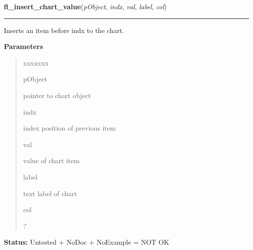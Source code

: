 \hspace{.8\funcindent}\begin{boxedminipage}{\funcwidth}

    \raggedright \textbf{fl\_insert\_chart\_value}(\textit{pObject}, \textit{indx}, \textit{val}, \textit{label}, \textit{col})

    \vspace{-1.5ex}

    \rule{\textwidth}{0.5\fboxrule}
\setlength{\parskip}{2ex}
    Inserts an item before indx to the chart.

\setlength{\parskip}{1ex}
      \textbf{Parameters}
      \vspace{-1ex}

      \begin{quote}
        \begin{Ventry}{xxxxxxx}

          \item[pObject]

          pointer to chart object

          \item[indx]

          index position of previous item

          \item[val]

          value of chart item

          \item[label]

          text label of chart

          \item[col]

          ?

        \end{Ventry}

      \end{quote}

\textbf{Status:} Untested + NoDoc + NoExample = NOT OK



    \end{boxedminipage}

    \label{xformslib:library:fl_replace_chart_value}

    \vspace{0.5ex}

